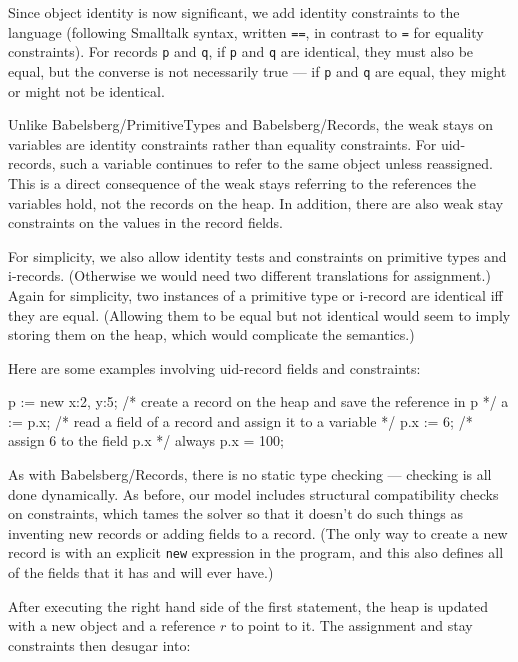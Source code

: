 \documentclass{article}
\newcounter{examples}
\begin{document}
Since object identity is now significant, we add identity constraints
to the language (following Smalltalk syntax, 
written \verb|==|, in contrast to \verb|=| for
equality constraints).  For records \verb|p| and \verb|q|, if \verb|p|
and \verb|q| are identical, they must also be equal, but the converse
is not necessarily true --- if \verb|p| and \verb|q| are equal, they
might or might not be identical.

Unlike Babelsberg/PrimitiveTypes and Babelsberg/Records, the weak
stays on variables are identity constraints rather than equality
constraints.  For uid-records, such a variable continues to refer to
the same object unless reassigned.  This is a direct consequence of
the weak stays referring to the references the variables hold, not the
records on the heap.  In addition, there are also weak stay
constraints on the values in the record fields.

For simplicity, we also allow identity tests and constraints on
primitive types and i-records.  (Otherwise we would need two different
translations for assignment.)  Again for simplicity, two instances of
a primitive type or i-record are identical iff they are equal.
(Allowing them to be equal but not identical would seem to imply
storing them on the heap, which would complicate the semantics.)

Here are some examples involving uid-record fields and constraints:
\begin{example}
p := new {x:2, y:5}; /* create a record on the heap and save the
                        reference in p */
a := p.x;            /* read a field of a record and assign it
                        to a variable */
p.x := 6;            /* assign 6 to the field p.x */
always p.x = 100;
\end{example}

As with Babelsberg/Records, there is no static type checking ---
checking is all done dynamically.  As before, our model includes
structural compatibility checks on constraints, which tames the solver so
that it doesn't do such things as inventing new records or adding fields
to a record.  (The only way to create a new record is with an explicit
\verb|new| expression in the program, and this also defines all of the
fields that it has and will ever have.)

After executing the right hand side of the first statement, the heap
is updated with a new object and a reference $r$ to point to it. The
assignment and stay constraints then desugar into:
\end{document}
